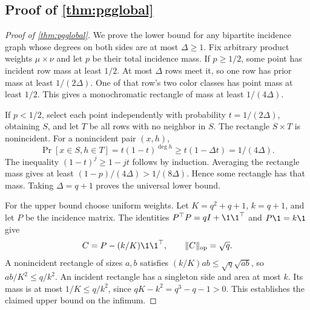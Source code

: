 \subsection[Proof of result pgglobal]{Proof of \cref{thm:pgglobal}}\label{proof:pgglobal}
\begin{proof}[Proof of \cref{thm:pgglobal}]
We prove the lower bound for any bipartite incidence graph whose degrees on both sides are at most $\Delta\ge1$. Fix arbitrary product weights $\mu\times\nu$ and let $p$ be their total incidence mass. If $p\ge1/2$, some point has incident row mass at least $1/2$. At most $\Delta$ rows meet it, so one row has prior mass at least $1/(2\Delta)$. One of that row's two color classes has point mass at least $1/2$. This gives a monochromatic rectangle of mass at least $1/(4\Delta)$.

If $p<1/2$, select each point independently with probability $t=1/(2\Delta)$, obtaining $S$, and let $T$ be all rows with no neighbor in $S$. The rectangle $S\times T$ is nonincident. For a nonincident pair $(x,h)$,
\[
 \Pr[x\in S,h\in T]=t(1-t)^{\deg h}
 \ge t(1-\Delta t)=1/(4\Delta).
\]
The inequality $(1-t)^j\ge1-jt$ follows by induction. Averaging the rectangle mass gives at least $(1-p)/(4\Delta)>1/(8\Delta)$. Hence some rectangle has that mass. Taking $\Delta=q+1$ proves the universal lower bound.

For the upper bound choose uniform weights. Let $K=q^2+q+1$, $k=q+1$, and let $P$ be the incidence matrix. The identities $P^\top P=qI+\1\1^\top$ and $P\1=k\1$ give
\[
 C=P-(k/K)\1\1^\top,\qquad \|C\|_{\rm op}=\sqrt q.
\]
A nonincident rectangle of sizes $a,b$ satisfies $(k/K)ab\le\sqrt q\sqrt{ab}$, so $ab/K^2\le q/k^2$. An incident rectangle has a singleton side and area at most $k$. Its mass is at most $1/K\le q/k^2$, since $qK-k^2=q^3-q-1>0$. This establishes the claimed upper bound on the infimum.
\end{proof}

